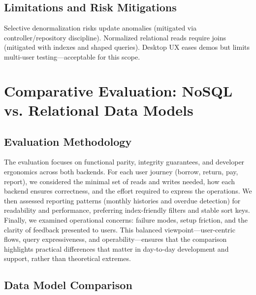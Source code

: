 \documentclass[12pt,a4paper]{article}
\begin{document}
\subsection{Limitations and Risk Mitigations}

Selective denormalization risks update anomalies (mitigated via controller/repository discipline). Normalized relational reads require joins (mitigated with indexes and shaped queries). Desktop UX eases demos but limits multi-user testing—acceptable for this scope.

\section{Comparative Evaluation: NoSQL vs. Relational Data Models}

\subsection{Evaluation Methodology}

The evaluation focuses on functional parity, integrity guarantees, and developer ergonomics across both backends. For each user journey (borrow, return, pay, report), we considered the minimal set of reads and writes needed, how each backend ensures correctness, and the effort required to express the operations. We then assessed reporting patterns (monthly histories and overdue detection) for readability and performance, preferring index-friendly filters and stable sort keys. Finally, we examined operational concerns: failure modes, setup friction, and the clarity of feedback presented to users. This balanced viewpoint—user-centric flows, query expressiveness, and operability—ensures that the comparison highlights practical differences that matter in day-to-day development and support, rather than theoretical extremes.

\subsection{Data Model Comparison}
\end{document}
